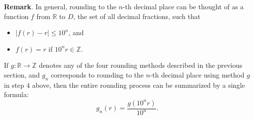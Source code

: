 \documentclass[12pt]{article}
\begin{document}
\textbf{Remark}.  In general, rounding to the $n$-th decimal place can be thought of as a function $f$ from $\mathbb{R}$ to $D$, the set of all decimal fractions, such that 
\begin{itemize}
\item $|f(r)-r|\le 10^n$, and
\item $f(r)=r$ if $10^nr\in \mathbb{Z}$.
\end{itemize}
If $g:\mathbb{R}\to \mathbb{Z}$ denotes any of the four rounding methods described in the previous section, and $g_n$ corresponds to rounding to the $n$-th decimal place using method $g$ in step $4$ above, then the entire rounding process can be summarized by a single formula: $$g_n(r)=\frac{g(10^n r)}{10^n}.$$
\end{document}
